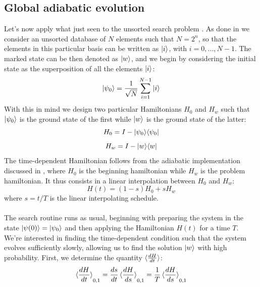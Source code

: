     \subsection{Global adiabatic evolution}\label{subsec:global adiabatic}
    Let's now apply what just seen to the unsorted search problem \cite{Roland2002}. As done in  we consider an unsorted database of $N$ elements such that $N=2^n$, so that the elements in this particular basis can be written as ${|{i}\rangle}$, with $i=0,...,N-1$. The marked state can be then denoted as ${|{w}\rangle}$, and we begin by considering the initial state as the superposition of all the elements ${|{i}\rangle}$:
    \begin{equation}
      {|{\psi_0}\rangle}=\frac{1}{\sqrt{N}}\sum_{i=1}^{N-1}{|{i}\rangle}
    \end{equation}
    With this in mind we design two particular Hamiltonians $H_0$ and $H_w$ such that ${|{\psi_0}\rangle}$ is the ground state of the first while ${|{w}\rangle}$ is the ground state of the latter:
    \begin{equation}
      H_0 = I- {|{\psi_0}\rangle}{\langle{\psi_0}|}
      \label{eq:adiabatic_ground}
    \end{equation}
    \vspace{-1cm}
    \begin{equation}
      H_w = I- {|{w}\rangle}{\langle{w}|}
      \label{eq:adiabatic_first}
    \end{equation}
    The time-dependent Hamiltonian follows from the adiabatic implementation discussed in , where $H_0$ is the beginning hamiltonian while $H_w$ is the problem hamiltonian. It thus consists in a linear interpolation between $H_0$ and $H_w$:
    \begin{equation}
      H(t) = (1-s)H_0 + sH_w
    \end{equation}
    where $s=t/T$ is the linear interpolating schedule.\\ \\
    The search routine runs as usual, beginning with preparing the system in the state ${|{\psi(0)}\rangle}={|{\psi_0}\rangle}$ and then applying the Hamiltonian $H(t)$ for a time $T$. We're interested in finding the time-dependent condition such that the system evolves sufficiently slowly, allowing us to find the solution ${|{w}\rangle}$ with high probability. First, we determine the quantity $\braket{\frac{dH}{dt}}$:
    \begin{equation}
      \braket{\frac{dH}{dt}}_{0,1} = \frac{ds}{dt}\braket{\frac{dH}{ds}}_{0,1} = \frac{1}{T}\braket{\frac{dH}{ds}}_{0,1}
    \end{equation}

